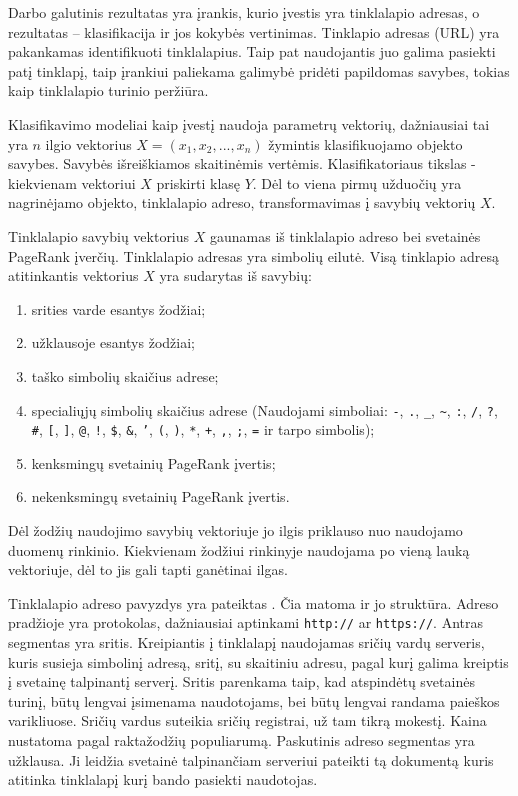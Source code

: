 Darbo galutinis rezultatas yra įrankis, kurio įvestis yra tinklalapio adresas, o rezultatas -- klasifikacija ir jos kokybės vertinimas. Tinklapio adresas (URL) yra pakankamas identifikuoti tinklalapius. Taip pat naudojantis juo galima pasiekti patį tinklapį, taip įrankiui paliekama galimybė pridėti papildomas savybes, tokias kaip tinklalapio turinio peržiūra.

Klasifikavimo modeliai kaip įvestį naudoja parametrų vektorių, dažniausiai tai yra $n$ ilgio vektorius $X = (x_1, x_2, ... , x_n)$ žymintis klasifikuojamo objekto savybes. Savybės išreiškiamos skaitinėmis vertėmis. Klasifikatoriaus tikslas - kiekvienam vektoriui $X$ priskirti klasę $Y$. Dėl to viena pirmų užduočių yra nagrinėjamo objekto, tinklalapio adreso, transformavimas į savybių vektorių $X$.


Tinklalapio savybių vektorius $X$ gaunamas iš tinklalapio adreso bei svetainės PageRank įverčių. Tinklalapio adresas yra simbolių eilutė. Visą tinklapio adresą atitinkantis vektorius $X$ yra sudarytas iš savybių:
\begin{enumerate}
\item srities varde esantys žodžiai;
\item užklausoje esantys žodžiai;
\item taško simbolių skaičius adrese;
\item specialiųjų simbolių skaičius adrese (Naudojami simboliai:
\texttt{-},
\texttt{.},
\texttt{\_},
\texttt{\~},
\texttt{:},
\texttt{/},
\texttt{?},
\texttt{\#},
\texttt{[},
\texttt{]},
\texttt{@},
\texttt{!},
\texttt{\$},
\texttt{\&},
\texttt{'},
\texttt{(},
\texttt{)},
\texttt{*},
\texttt{+},
\texttt{,},
\texttt{;},
\texttt{=}
ir tarpo simbolis);
\item kenksmingų svetainių PageRank įvertis;
\item nekenksmingų svetainių PageRank įvertis.
\end{enumerate}
Dėl žodžių naudojimo savybių vektoriuje jo ilgis priklauso nuo naudojamo duomenų rinkinio. Kiekvienam žodžiui rinkinyje naudojama po vieną lauką vektoriuje, dėl to jis gali tapti ganėtinai ilgas.


Tinklalapio adreso pavyzdys yra pateiktas . Čia matoma ir jo struktūra. Adreso pradžioje yra protokolas, dažniausiai aptinkami \texttt{http://} ar \texttt{https://}. Antras segmentas yra sritis. Kreipiantis į tinklalapį naudojamas sričių vardų serveris, kuris susieja simbolinį adresą, sritį, su skaitiniu adresu, pagal kurį galima kreiptis į svetainę talpinantį serverį. Sritis parenkama taip, kad atspindėtų svetainės turinį, būtų lengvai įsimenama naudotojams, bei būtų lengvai randama paieškos varikliuose. Sričių vardus suteikia sričių registrai, už tam tikrą mokestį. Kaina nustatoma pagal raktažodžių populiarumą. Paskutinis adreso segmentas yra užklausa. Ji leidžia svetainė talpinančiam serveriui pateikti tą dokumentą kuris atitinka tinklalapį kurį bando pasiekti naudotojas.

